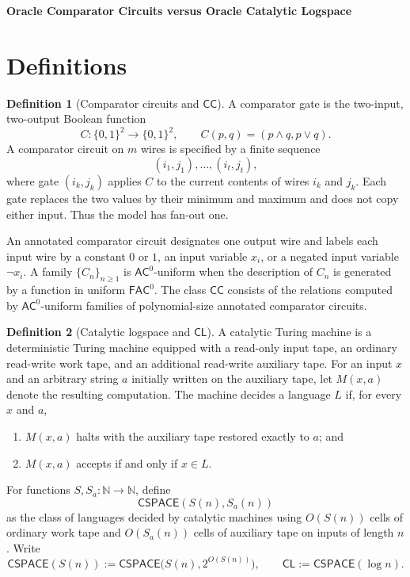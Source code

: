 \documentclass[10pt,a4paper]{article}
\theoremstyle{definition}
\newtheorem*{definition*}{Definition}
\begin{document}
\begin{center}
  {\Large\bfseries Oracle Comparator Circuits versus Oracle Catalytic Logspace}
\end{center}

\section{Definitions}

\begin{definition*}[Comparator circuits and $\mathsf{CC}$]
A comparator gate is the two-input, two-output Boolean function
\begin{equation}
  C:\{0,1\}^2\longrightarrow\{0,1\}^2,
  \qquad
  C(p,q)=(p\wedge q,p\vee q).
\end{equation}
A comparator circuit on $m$ wires is specified by a finite sequence
\begin{equation}
  (i_1,j_1),\ldots,(i_t,j_t),
\end{equation}
where gate $(i_k,j_k)$ applies $C$ to the current contents of wires $i_k$ and
$j_k$. Each gate replaces the two values by their minimum and maximum and does
not copy either input. Thus the model has fan-out one.

An annotated comparator circuit designates one output wire and labels each
input wire by a constant $0$ or $1$, an input variable $x_i$, or a negated
input variable $\neg x_i$. A family $\{C_n\}_{n\geq1}$ is
$\mathsf{AC}^0$-uniform when the description of $C_n$ is generated by a
function in uniform $\mathsf{FAC}^0$. The class $\mathsf{CC}$ consists of the
relations computed by $\mathsf{AC}^0$-uniform families of polynomial-size
annotated comparator circuits.
\end{definition*}

\begin{definition*}[Catalytic logspace and $\mathsf{CL}$]
A catalytic Turing machine is a deterministic Turing machine equipped with a
read-only input tape, an ordinary read-write work tape, and an additional
read-write auxiliary tape. For an input $x$ and an arbitrary string $a$
initially written on the auxiliary tape, let $M(x,a)$ denote the resulting
computation. The machine decides a language $L$ if, for every $x$ and $a$,
\begin{enumerate}
  \item $M(x,a)$ halts with the auxiliary tape restored exactly to $a$; and
  \item $M(x,a)$ accepts if and only if $x\in L$.
\end{enumerate}
For functions $S,S_a:\mathbb N\to\mathbb N$, define
\begin{equation}
  \mathsf{CSPACE}(S(n),S_a(n))
\end{equation}
as the class of languages decided by catalytic machines using $O(S(n))$ cells
of ordinary work tape and $O(S_a(n))$ cells of auxiliary tape on inputs of
length $n$. Write
\begin{equation}
  \mathsf{CSPACE}(S(n))
  :=
  \mathsf{CSPACE}\bigl(S(n),2^{O(S(n))}\bigr),
  \qquad
  \mathsf{CL}:=\mathsf{CSPACE}(\log n).
\end{equation}
\end{definition*}
\end{document}
